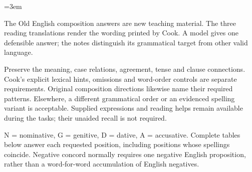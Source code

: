 \BookRecto
\begingroup
\renewcommand{\runningtitle}{Unit 15. Answer key}
\emergencystretch=3em
\newcommand{\itempara}[2]{\par\addvspace{3pt}\noindent\hangindent=1.8em\hangafter=1\makebox[1.8em][l]{#1.}#2\par}
\newcommand{\reserve}[1]{\par\penalty-100\begingroup\dimen0=\pagegoal\advance\dimen0 by-\pagetotal\ifdim\dimen0<#1\newpage\fi\endgroup}

\raggedright
{}

The Old English composition answers are new teaching material. The three reading translations render the wording printed by Cook. A model gives one defensible answer; the notes distinguish its grammatical target from other valid language.

Preserve the meaning, case relations, agreement, tense and clause connections. Cook’s explicit lexical hints, omissions and word-order controls are separate requirements. Original composition directions likewise name their required patterns. Elsewhere, a different grammatical order or an evidenced spelling variant is acceptable. Supplied expressions and reading helps remain available during the tasks; their unaided recall is not required.

N = nominative, G = genitive, D = dative, A = accusative. Complete tables below answer each requested position, including positions whose spellings coincide. Negative concord normally requires one negative English proposition, rather than a word-for-word accumulation of English negatives.


